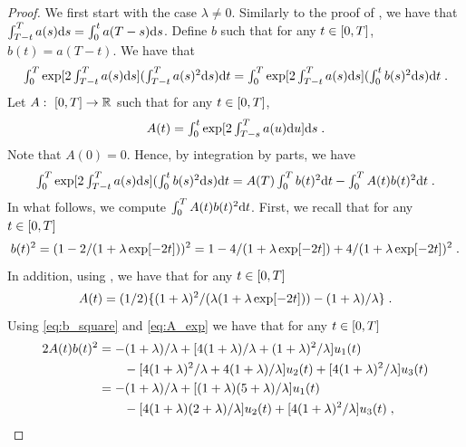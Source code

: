 \begin{proof}
  We first start with the case $\lambda \neq 0$.
  Similarly to the proof of , we have that
  $\int_{T-t}^T a(s) \mathrm{d} s = \int_0^{t} a(T-s) \mathrm{d} s$.  Define $b$ such that
  for any $t \in \left[0,T\right]$, $b(t) = a (T-t)$. We have that
  \begin{equation}
    \textstyle{
      \int_0^T \exp[2\int_{T-t}^T a(s) \mathrm{d}s] (\int_{T-t}^T a(s)^2 \mathrm{d}s) \mathrm{d}t = \int_0^T \exp[2\int_{T-t}^T a(s) \mathrm{d}s] (\int_{0}^t b(s)^2 \mathrm{d}s) \mathrm{d}t \;.
      }
    \end{equation}
    Let $A: \ \left[0,T\right] \to \mathbb{R}$ such that for any $t \in \left[0,T\right]$,
    \begin{equation}
      \textstyle{
        A(t) = \int_0^t \exp[2\int_{T-s}^T a(u) \mathrm{d}u] \mathrm{d}s \;.
        }
    \end{equation}
    Note that $A(0) = 0$. Hence, by integration by parts, we have
    \begin{equation}
      \textstyle{ \int_0^T \exp[2\int_{T-t}^T a(s) \mathrm{d}s] (\int_{0}^t b(s)^2 \mathrm{d}s) \mathrm{d}t = A(T)\int_0^T b(t)^2 \mathrm{d}t - \int_0^T A(t) b(t)^2 \mathrm{d}t \;. }
    \end{equation}
    In what follows, we compute $\int_0^T A(t) b(t)^2 \mathrm{d} t$. First, we recall that for any $t \in \left[0,T\right]$
    \begin{equation}\label{eq:b_square}
      b(t)^2 = (1 - 2/(1 + \lambda \exp[-2t]))^2 = 1 - 4/(1 + \lambda \exp[-2t]) + 4/(1 + \lambda \exp[-2t])^2 \; . 
    \end{equation}
    In addition, using , we have that for any $t \in \left[0,T\right]$
    \begin{equation}
      \label{eq:A_exp}
      A(t) = (1/2)\{ (1+\lambda)^2/(\lambda(1 + \lambda \exp[-2t])) - (1+\lambda)/\lambda\} \; . 
    \end{equation}
    Using \eqref{eq:b_square} and \eqref{eq:A_exp} we have that for any $t \in \left[0,T\right]$
    \begin{align}
      2A(t)b(t)^2 &= -(1+\lambda)/\lambda + [4(1+\lambda)/\lambda +(1+\lambda)^2/\lambda] u_1(t) \\
                 & \qquad - [4(1+\lambda)^2/\lambda + 4(1+\lambda)/\lambda] u_2(t) + [4(1+\lambda)^2/\lambda] u_3(t) \\
      &= -(1+\lambda)/\lambda + [(1+\lambda)(5 + \lambda)/\lambda] u_1(t) \\
      & \qquad - [4(1+\lambda)(2+\lambda)/\lambda] u_2(t) + [4(1+\lambda)^2/\lambda] u_3(t)\eqsp , \label{eq:dev_long}

\end{align}
\end{proof}
